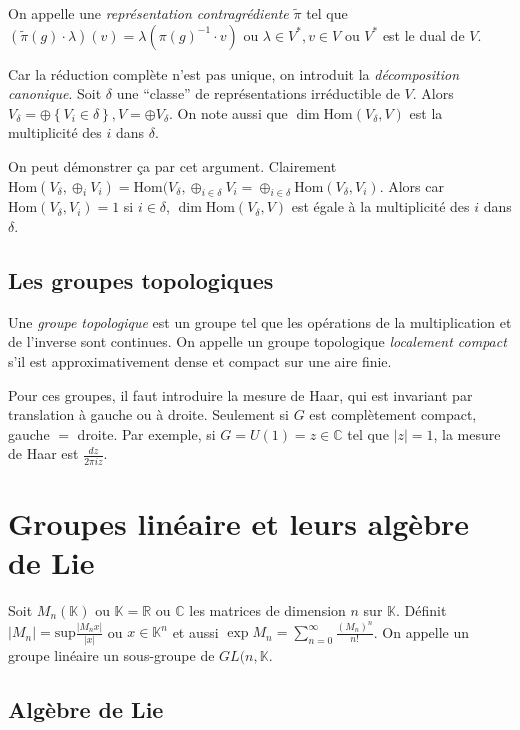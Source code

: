 \documentclass[10pt]{report}
\newcommand{\abs}[1]{\left|#1\right|}
\begin{document}
On appelle une \emph{repr\'esentation contragr\'ediente} $\tilde{\pi}$ tel que $(\tilde{\pi}(g) \cdot \lambda)(v) = \lambda(\pi(g)^{-1} \cdot v)$ ou $\lambda \in V^*, v \in V$ ou $V^*$ est le dual de $V$.

Car la r\'eduction compl\`ete n'est pas unique, on introduit la \emph{d\'ecomposition canonique}. Soit $\delta$ une ``classe'' de repr\'esentations irr\'eductible de $V$. Alors $V_\delta = \oplus \left\{ V_i \in \delta \right\}, V = \oplus V_\delta$. On note aussi que $\dim \mathrm{Hom} (V_\delta, V)$ est la multiplicit\'e des $i$ dans $\delta$.

On peut d\'emonstrer \c{c}a par cet argument. Clairement $\mathrm{Hom}(V_\delta, \oplus_i V_i) = \mathrm{Hom}(V_\delta,\oplus_{i\in\delta}V_i = \oplus_{i\in \delta}\mathrm{Hom}(V_\delta,V_i)$. Alors car $\mathrm{Hom}(V_\delta, V_i) = 1$ si $i \in \delta$, $\dim \mathrm{Hom}(V_\delta,V)$ est \'egale \`a la multiplicit\'e des $i$ dans $\delta$. 

\subsection{Les groupes topologiques}

Une \emph{groupe topologique} est un groupe tel que les op\'erations de la multiplication et de l'inverse sont continues. On appelle un groupe topologique \emph{localement compact} s'il est approximativement dense et compact sur une aire finie.

Pour ces groupes, il faut introduire la mesure de Haar, qui est invariant par translation \`a gauche ou \`a droite. Seulement si $G$ est compl\`etement compact, gauche $=$ droite. Par exemple, si $G = U(1) = z \in \mathbb{C}$ tel que $\abs{z} = 1$, la mesure de Haar est $\frac{dz}{2\pi iz}$. 

\section{Groupes lin\'eaire et leurs alg\`ebre de Lie}

Soit $M_n(\mathbb{K})$ ou $\mathbb{K} = \mathbb{R}$ ou $\mathbb{C}$ les matrices de dimension $n$ sur $\mathbb{K}$. D\'efinit $\abs{M_n} = \mathrm{sup} \frac{\abs{M_n x}}{\abs{x}}$ ou $x \in \mathbb{K}^n$ et aussi $\exp M_n = \sum\limits_{n=0}^{\infty}\frac{(M_n)^n}{n!}$. On appelle un groupe lin\'eaire un sous-groupe de $GL(n,\mathbb{K}$.

\subsection{Alg\`ebre de Lie}
\end{document}
